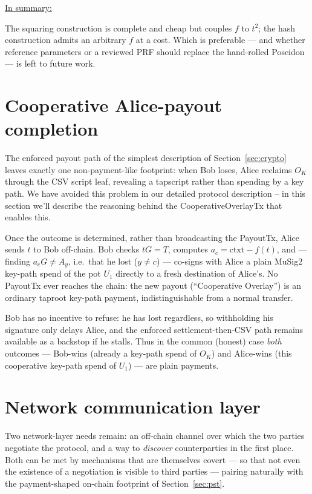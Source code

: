 \documentclass[11pt]{article}
\begin{document}
\underline{In summary:}

The squaring construction is complete and cheap but couples $f$ to $t^2$; the hash construction admits an arbitrary $f$ at a cost. Which is preferable --- and whether reference parameters or a reviewed PRF should replace the hand-rolled Poseidon --- is left to future work.


\section{Cooperative Alice-payout completion}
\label{sec:coop}

The enforced payout path of the simplest description of Section~\ref{sec:crypto} leaves exactly one non-payment-like footprint: when Bob loses, Alice reclaims $O_K$ through the CSV script leaf, revealing a tapscript rather than spending by a key path. We have avoided this problem in our detailed protocol description -- in this section we'll describe the reasoning behind the CooperativeOverlayTx that enables this.

Once the outcome is determined, rather than broadcasting the PayoutTx, Alice sends $t$ to Bob off-chain. Bob checks $tG=T$, computes $a_c=\textrm{ctxt}-f(t)$, and --- finding $a_c G\neq A_y$, i.e.\ that he lost ($y\neq c$) --- co-signs with Alice a plain MuSig2 key-path spend of the pot $U_1$ directly to a fresh destination of Alice's. No PayoutTx ever reaches the chain: the new payout (``Cooperative Overlay'') is an ordinary taproot key-path payment, indistinguishable from a normal transfer.

Bob has no incentive to refuse: he has lost regardless, so withholding his signature only delays Alice, and the enforced settlement-then-CSV path remains available as a backstop if he stalls. Thus in the common (honest) case \emph{both} outcomes --- Bob-wins (already a key-path spend of $O_K$) and Alice-wins (this cooperative key-path spend of $U_1$) --- are plain payments.


\section{Network communication layer}
\label{sec:netlayer}

Two network-layer needs remain: an off-chain channel over which the two parties negotiate the protocol, and a way to \emph{discover} counterparties in the first place. Both can be met by mechanisms that are themselves covert --- so that not even the existence of a negotiation is visible to third parties --- pairing naturally with the payment-shaped on-chain footprint of Section~\ref{sec:pst}.
\end{document}
